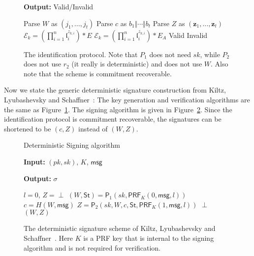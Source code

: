 \documentclass{llncs}
\newcommand{\E}{\mathcal{E}}
\newcommand{\msg}{\mathsf{msg}}
\renewcommand{\l}{\mathfrak{l}}
\newcommand{\z}{\mathbf{z}}
\newcommand{\PP}{\mathsf{P}}
\newcommand{\St}{\textsf{St}}
\newcommand{\PRF}{\mathsf{PRF}}
\begin{document}
\begin{figure}
\begin{minipage}{0.45\textwidth}
\begin{algorithm}[H]
	\textbf{Output:} Valid/Invalid

	\begin{algorithmic}[1]
		\State Parse $W$ as $(j_1 , \dots, j_t)$
		\State Parse $c$ as $b_1 \Vert \cdots \Vert b_t$
		\State Parse $Z$ as $(\z_1, \dots, \z_t)$
		\State $\E_k = ( \prod_{i=1}^n \l_i^{z_{k,i}} ) * E$
		\Else
		\State $\E_k = ( \prod_{i=1}^n \l_i^{z_{k,i}} ) * E_A$
		\EndIf
		\EndFor
		\If{$(j_1, \dots, j_t) = (j(\E_1) , \dots, j(\E_t))$} \State \Return Valid
		\Else \State \Return Invalid \EndIf
	\end{algorithmic}
\end{algorithm}
\end{minipage}
\caption{The identification protocol. Note that $P_1$ does not need $sk$, while $P_2$ does not use $r_2$ (it really is deterministic) and does not use $W$. Also note that the scheme is commitment recoverable. \label{fig:id-scheme}}
\end{figure}


Now we state the generic deterministic signature construction from Kiltz, Lyubashevsky and Schaffner~\cite{KLS18}:
The key generation and verification algorithms are the same as Figure~\ref{fig:id-scheme}. The signing algorithm is given in Figure~\ref{fig:sign}. 
Since the identification protocol is commitment recoverable, the signatures can be shortened to be $(c, Z )$ instead of $(W,Z)$.

\begin{figure}
\begin{algorithm}[H]
	\caption{Deterministic Signing algorithm}
	\textbf{Input:} $(pk,sk)$, $K$, $\msg$

	\textbf{Output:} $\sigma$

	\begin{algorithmic}[1]
		\State $l = 0$, $Z = \perp$
		\State $(W,\St) = \PP_1( sk, \PRF_K( 0, \msg, l ))$
		\State $c = H( W, \msg )$ 
		\State $Z = \PP_2( sk, W, c, \St, \PRF_K( 1, \msg, l ))$
		\EndWhile
		\State \Return $\perp$
		\Else
		\State \Return $(W,Z)$
		\EndIf
	\end{algorithmic}
\end{algorithm}
\caption{The deterministic signature scheme of Kiltz, Lyubashevsky and Schaffner~\cite{KLS18}. Here $K$ is a PRF key that is internal to the signing algorithm and is not required for verification. \label{fig:sign}}
\end{figure}
\end{document}
